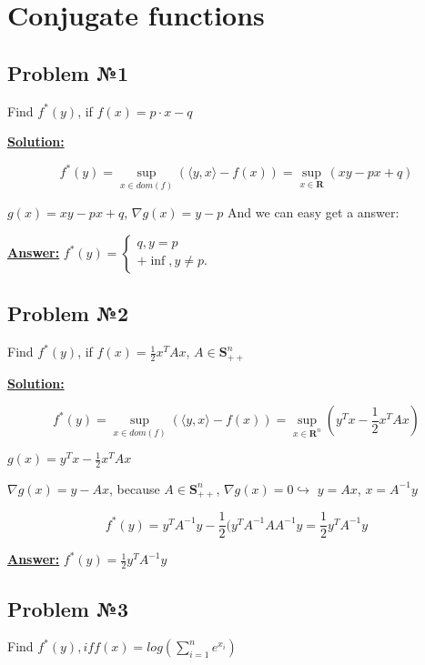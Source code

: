\section{Conjugate functions}

\subsection{Problem №1} Find $f^*(y)$, if $f(x) = p \cdot x - q$

\underline{\textbf{Solution:}}

\begin{equation*}
    f^*(y) = \sup_{x \in dom(f)} \left( 
    \langle y, x \rangle - f(x) \right) = \sup_{x \in \mathbf{R}} \left( xy - px + q\right)
\end{equation*}

$g(x) = xy - px + q$, $\nabla g(x) = y - p$
And we can easy get a answer:

\underline{\textbf{Answer:}} $f^*(y) = \begin{cases}
   q, y = p \\
   +\inf , y \ne p.
 \end{cases}$

\subsection{Problem №2}
Find $f^*(y)$, if $f(x) = \frac{1}{2}x^TAx$, $A \in \mathbf{S}_{++}^n$

\underline{\textbf{Solution:}}

\begin{equation*}
    f^*(y) = \sup_{x \in dom(f)} \left( 
    \langle y, x \rangle - f(x) \right) = \sup_{x \in \mathbf{R}^n} \left( y^Tx - \frac{1}{2}x^TAx\right)
\end{equation*}

$g(x) = y^Tx - \frac{1}{2}x^TAx$

$\nabla g(x) = y - Ax$, because $A \in \mathbf{S}_{++}^n$, $\nabla g(x) = 0 \hookrightarrow$
$y = Ax$, $x = A^{-1}y$

\begin{equation*}
    f^*(y) = y^TA^{-1}y - \frac{1}{2}(y^TA^{-1}AA^{-1}y = \frac{1}{2}y^TA^{-1}y
\end{equation*}

\underline{\textbf{Answer:}} $f^*(y) = \frac{1}{2}y^TA^{-1}y$

\subsection{Problem №3}
Find $f^*(y), if f(x) = log \left( \sum\limits_{i=1}^n e^{x_i}\right)$

